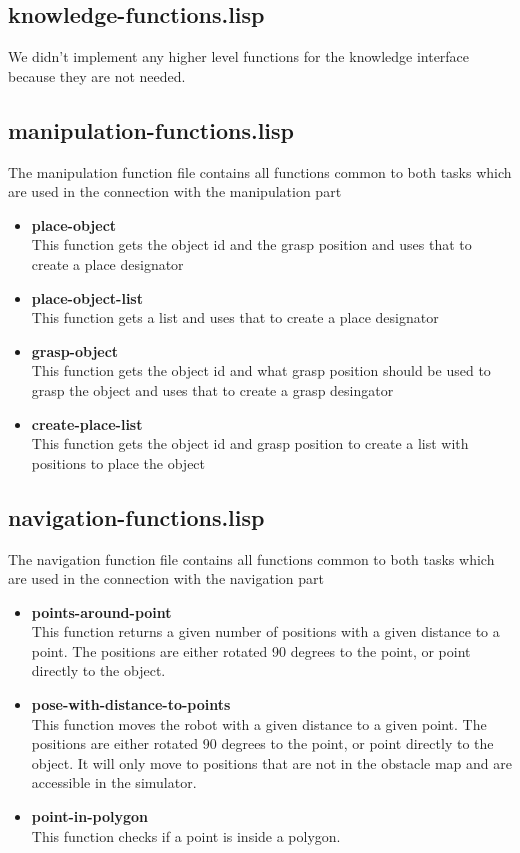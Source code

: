 \documentclass[main.tex]{subfiles}
\begin{document}
	    \subsection{knowledge-functions.lisp}
	     We didn't implement any higher level functions for the knowledge interface because they are not needed.
	    \subsection{manipulation-functions.lisp}
	    The manipulation function file contains all functions common to both tasks which are used in the connection with the manipulation part
	    \begin{itemize}
	    \item \textbf{place-object} \\
	    This function gets the object id and the grasp position and uses that to create a place designator  
		\item \textbf{place-object-list} \\
		This function gets a list and uses that to create a place designator 
	    \item \textbf{grasp-object} \\
	    This function gets the object id and what grasp position should be used to grasp the object and uses that to create a grasp desingator
	    \item \textbf{create-place-list} \\
	    This function gets the object id and grasp position to create a list with positions to place the object
		\end{itemize}
	    \subsection{navigation-functions.lisp}
	    The navigation function file contains all functions common to both tasks which are used in the connection with the navigation part
	    \begin{itemize}
	    	\item \textbf{points-around-point} \\
	    	This function returns a given number of positions with a given 	distance to a point. The positions are either rotated 90 degrees to the point, or point directly to the object.
	    	\item \textbf{pose-with-distance-to-points} \\
	    	This function moves the robot with a given distance to a given point. The positions are either rotated 90 degrees to the point, or point directly to the object. It will only move to positions that are not in the obstacle map and are accessible in the simulator.
	    	\item \textbf{point-in-polygon} \\
This function checks if a point is inside a polygon.
	    \end{itemize}
\end{document}
